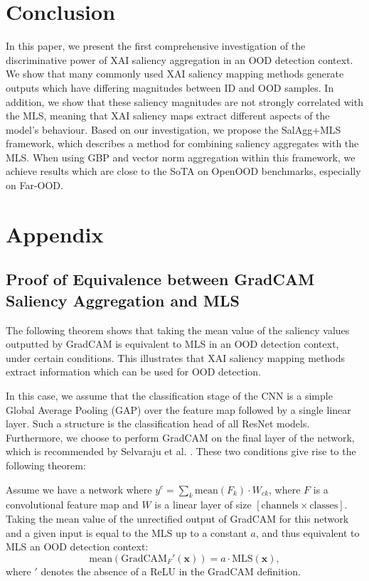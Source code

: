 \documentclass[runningheads]{llncs}
\begin{document}
\section{Conclusion}

In this paper, we present the first comprehensive investigation of the discriminative power of XAI saliency aggregation in an OOD detection context. We show that many commonly used XAI saliency mapping methods generate outputs which have differing magnitudes between ID and OOD samples. In addition, we show that these saliency magnitudes are not strongly correlated with the MLS, meaning that XAI saliency maps extract different aspects of the model's behaviour. Based on our investigation, we propose the SalAgg+MLS framework, which describes a method for combining saliency aggregates with the MLS. When using GBP and vector norm aggregation within this framework, we achieve results which are close to the SoTA on OpenOOD benchmarks, especially on Far-OOD.




\section*{Appendix} \label{section:appendix}

\subsection*{Proof of Equivalence between GradCAM Saliency Aggregation and MLS}

The following theorem shows that taking the mean value of the saliency values outputted by GradCAM is equivalent to MLS in an OOD detection context, under certain conditions. This illustrates that XAI saliency mapping methods extract information which can be used for OOD detection.

In this case, we assume that the classification stage of the CNN is a simple Global Average Pooling (GAP) over the feature map followed by a single linear layer. Such a structure is the classification head of all ResNet models. Furthermore, we choose to perform GradCAM on the final layer of the network, which is recommended by Selvaraju et al. \cite{gradcam}. These two conditions give rise to the following theorem:

\begin{theorem} \label{theorem}
    Assume we have a network where $y^c = \sum_k \text{mean}(F_k) \cdot W_{ck}$, where $F$ is a convolutional feature map and $W$ is a linear layer of size $[\text{channels} \times \text{classes}]$. Taking the mean value of the unrectified output of GradCAM for this network and a given input is equal to the MLS up to a constant $a$, and thus equivalent to MLS an OOD detection context:
    \[\text{mean}(\text{GradCAM}_F'(\bm{x})) = a \cdot \text{MLS}(\bm{x}),\]
    where $'$ denotes the absence of a ReLU in the GradCAM definition.
\end{theorem}
\end{document}
